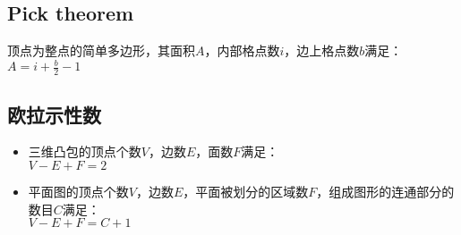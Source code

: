 \subsection*{Pick theorem}
    顶点为整点的简单多边形，其面积$ A $，内部格点数$ i $，边上格点数$ b $满足：
    \\$ A = i + \frac{b}{2} - 1 $

\subsection*{欧拉示性数}
    \begin{itemize}[wide=0pt]
        \item 三维凸包的顶点个数$ V $，边数$ E $，面数$ F $满足：
        \\$ V - E + F = 2 $
        \item 平面图的顶点个数$ V $，边数$ E $，平面被划分的区域数$ F $，组成图形的连通部分的数目$ C $满足：
        \\$ V - E + F = C + 1 $
    \end{itemize}

